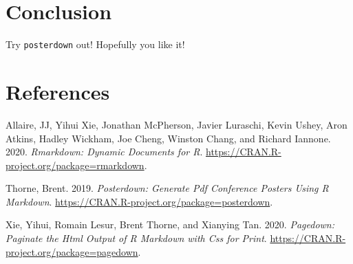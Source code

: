 \documentclass[]{article}
\begin{document}
\hypertarget{conclusion}{%
\section{Conclusion}\label{conclusion}}

Try \texttt{posterdown} out! Hopefully you like it!

\hypertarget{references}{%
\section*{References}\label{references}}

\hypertarget{refs}{}
\leavevmode\hypertarget{ref-R-rmarkdown}{}%
Allaire, JJ, Yihui Xie, Jonathan McPherson, Javier Luraschi, Kevin
Ushey, Aron Atkins, Hadley Wickham, Joe Cheng, Winston Chang, and
Richard Iannone. 2020. \emph{Rmarkdown: Dynamic Documents for R}.
\url{https://CRAN.R-project.org/package=rmarkdown}.

\leavevmode\hypertarget{ref-R-posterdown}{}%
Thorne, Brent. 2019. \emph{Posterdown: Generate Pdf Conference Posters
Using R Markdown}. \url{https://CRAN.R-project.org/package=posterdown}.

\leavevmode\hypertarget{ref-R-pagedown}{}%
Xie, Yihui, Romain Lesur, Brent Thorne, and Xianying Tan. 2020.
\emph{Pagedown: Paginate the Html Output of R Markdown with Css for
Print}. \url{https://CRAN.R-project.org/package=pagedown}.
\end{document}
